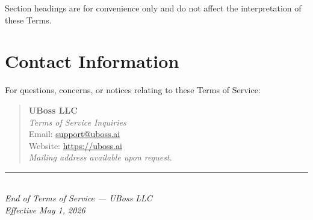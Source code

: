 \documentclass[11pt,letterpaper,parskip=half]{scrartcl}
\begin{document}
Section headings are for convenience only and do not affect the interpretation of these Terms.

\section{Contact Information}
\label{sec:contact}

For questions, concerns, or notices relating to these Terms of Service:

\begin{quote}
    \textbf{UBoss LLC}\\
    \textit{Terms of Service Inquiries}\\[0.5em]
    Email: \href{mailto:support@uboss.ai}{support@uboss.ai}\\
    Website: \href{https://uboss.ai}{https://uboss.ai}\\[0.5em]
    \textit{Mailing address available upon request.}
\end{quote}

\vspace{2em}

\begin{center}
    \textcolor{ruleline}{\rule{0.4\textwidth}{0.4pt}}\\[1em]
    {\color{accent}\textit{End of Terms of Service --- UBoss LLC}}\\
    {\color{accent}\textit{Effective May 1, 2026}}
\end{center}
\end{document}
